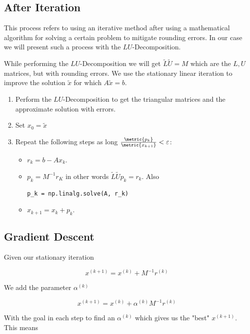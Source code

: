 \subsection{After Iteration}

This process refers to using an iterative method after using a mathematical algorithm for solving a certain problem to 
mitigate rounding errors. In our case we will present such a process with the \(LU\)-Decomposition.

While performing the \(LU\)-Decomposition we will get \(\tilde{L}\tilde{U} = M\) which are the \(L,U\) matrices, but with rounding errors.
We use the stationary linear iteration to improve the solution \(\tilde{x}\) for which \(A\tilde{x} = b\).

\begin{enumerate}

    \item Perform the \(LU\)-Decomposition to get the triangular matrices and the approximate solution with errors.

    \item Set \(x_0 = \tilde{x}\) 

    \item Repeat the following steps as long \(\frac{\metric{p_k}}{\metric{x_{k + 1}}} < \varepsilon\): 
    
    \begin{itemize}
        \item \(r_k = b - Ax_k \).
        \item \(p_k = M^{-1}r_K\) in other words \(\tilde{L}\tilde{U}p_k = r_k\). Also \begin{verbatim}p_k = np.linalg.solve(A, r_k)\end{verbatim}
        \item \(x_{k + 1} = x_k + p_k\).
    \end{itemize}
\end{enumerate}

\subsection{Gradient Descent}

Given our stationary iteration 

\[
    x^{(k + 1)} = x^{(k)} + M^{-1}r^{(k)}
\]

We add the parameter \(\alpha^{(k)}\)

\[
    x^{(k + 1)} = x^{(k)} + \alpha^{(k)}M^{-1}r^{(k)}
\]

With the goal in each step to find an \(\alpha^{(k)}\) which gives us the "best" \(x^{(k + 1)}\).
This means 

